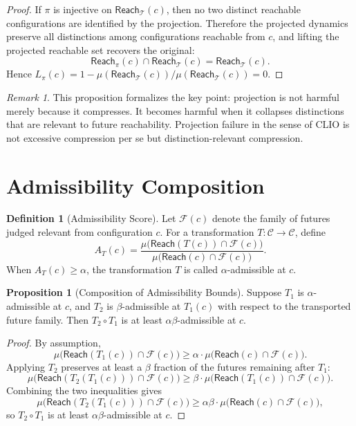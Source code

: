 \documentclass[11pt, oneside]{book}
\theoremstyle{definition}
\newtheorem{definition}{Definition}[chapter]
\newtheorem{proposition}{Proposition}[chapter]
\theoremstyle{remark}
\newtheorem{remark}{Remark}[chapter]
\begin{document}
\begin{proof}
If $\pi$ is injective on $\mathsf{Reach}_{\mathcal{T}}(c)$, then no two distinct reachable configurations are identified by the projection. Therefore the projected dynamics preserve all distinctions among configurations reachable from $c$, and lifting the projected reachable set recovers the original:
\[
\mathsf{Reach}_{\pi}(c)\cap \mathsf{Reach}_{\mathcal{T}}(c) = \mathsf{Reach}_{\mathcal{T}}(c).
\]
Hence $L_{\pi}(c) = 1 - \mu(\mathsf{Reach}_{\mathcal{T}}(c))/\mu(\mathsf{Reach}_{\mathcal{T}}(c)) = 0$.
\end{proof}

\begin{remark}
This proposition formalizes the key point: projection is not harmful merely because it compresses. It becomes harmful when it collapses distinctions that are relevant to future reachability. Projection failure in the sense of CLIO is not excessive compression per se but distinction-relevant compression.
\end{remark}

\section{Admissibility Composition}

\begin{definition}[Admissibility Score]
Let $\mathcal{F}(c)$ denote the family of futures judged relevant from configuration $c$. For a transformation $T:\mathcal{C}\to\mathcal{C}$, define
\[
A_T(c) = \frac{\mu\bigl(\mathsf{Reach}(T(c))\cap \mathcal{F}(c)\bigr)}{\mu\bigl(\mathsf{Reach}(c)\cap \mathcal{F}(c)\bigr)}.
\]
When $A_T(c)\geq \alpha$, the transformation $T$ is called $\alpha$-admissible at $c$.
\end{definition}

\begin{proposition}[Composition of Admissibility Bounds]
Suppose $T_1$ is $\alpha$-admissible at $c$, and $T_2$ is $\beta$-admissible at $T_1(c)$ with respect to the transported future family. Then $T_2\circ T_1$ is at least $\alpha\beta$-admissible at $c$.
\end{proposition}

\begin{proof}
By assumption,
\[
\mu\bigl(\mathsf{Reach}(T_1(c))\cap \mathcal{F}(c)\bigr) \geq \alpha\cdot\mu\bigl(\mathsf{Reach}(c)\cap \mathcal{F}(c)\bigr).
\]
Applying $T_2$ preserves at least a $\beta$ fraction of the futures remaining after $T_1$:
\[
\mu\bigl(\mathsf{Reach}(T_2(T_1(c)))\cap \mathcal{F}(c)\bigr) \geq \beta\cdot\mu\bigl(\mathsf{Reach}(T_1(c))\cap \mathcal{F}(c)\bigr).
\]
Combining the two inequalities gives
\[
\mu\bigl(\mathsf{Reach}(T_2(T_1(c)))\cap \mathcal{F}(c)\bigr) \geq \alpha\beta\cdot\mu\bigl(\mathsf{Reach}(c)\cap \mathcal{F}(c)\bigr),
\]
so $T_2\circ T_1$ is at least $\alpha\beta$-admissible at $c$.
\end{proof}
\end{document}
